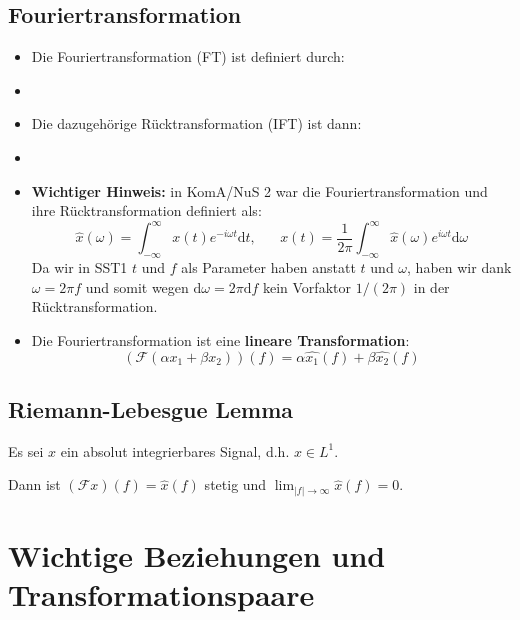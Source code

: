 \documentclass[11pt]{article}
\begin{document}
\subsection*{Fouriertransformation}
\vspace*{-0.5cm}
\begin{itemize}[leftmargin=0pt]
    \item[] Die Fouriertransformation (FT) ist definiert durch:
    \item[] %
    \item[] Die dazugehörige Rücktransformation (IFT) ist dann:
    \item[] %
\item[] \textbf{Wichtiger Hinweis:} in KomA/NuS 2 war die Fouriertransformation und ihre Rücktransformation definiert als:
$$\hat{x}(\omega) = \int_{-\infty}^{\infty} x(t) e^{-i\omega t}\text{d}t, \hspace{20pt} x(t)=\frac{1}{2\pi} \int_{-\infty}^{\infty} \hat{x}(\omega)e^{i\omega t} \text{d}\omega$$
Da wir in SST1 $t$ und $f$ als Parameter haben anstatt $t$ und $\omega$, haben wir dank $\omega = 2\pi f $ und somit wegen $\text{d}\omega = 2\pi \text{d}f$ kein Vorfaktor $1/(2\pi)$ in der Rücktransformation.
\item[] Die Fouriertransformation ist eine \textbf{lineare Transformation}:
$$(\mathcal{F}(\alpha x_1 + \beta x_2))(f) = \alpha \hat{x_1}(f) + \beta \hat{x_2}(f) $$
\end{itemize}

\pagebreak

\subsection*{Riemann-Lebesgue Lemma}
\vspace*{-0.5cm}
Es sei $x$ ein absolut integrierbares Signal, d.h. $x \in L^1$.

Dann ist $(\mathcal{F}x)(f) = \hat{x}(f)$ stetig und $\displaystyle\lim_{|f| \to \infty} \hat{x}(f) = 0$.

\section*{Wichtige Beziehungen und Transformationspaare}
\vspace*{-0.5cm}
\end{document}
